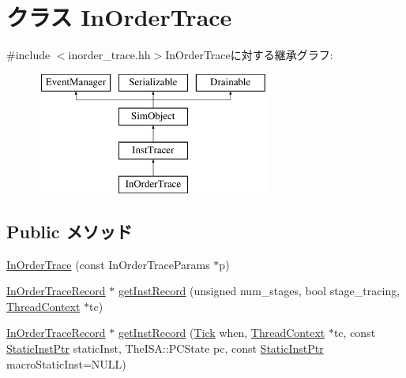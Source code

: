 \hypertarget{classTrace_1_1InOrderTrace}{
\section{クラス InOrderTrace}
\label{classTrace_1_1InOrderTrace}
}


{\ttfamily \#include $<$inorder\_\-trace.hh$>$}InOrderTraceに対する継承グラフ:\begin{figure}[H]
\begin{center}
\leavevmode
\includegraphics[height=4cm]{classTrace_1_1InOrderTrace}
\end{center}
\end{figure}
\subsection*{Public メソッド}
\begin{DoxyCompactItemize}
\item 
\hyperlink{classTrace_1_1InOrderTrace_ac03cbb45d572f3af9fe57cf76d843692}{InOrderTrace} (const InOrderTraceParams $\ast$p)
\item 
\hyperlink{classTrace_1_1InOrderTraceRecord}{InOrderTraceRecord} $\ast$ \hyperlink{classTrace_1_1InOrderTrace_a2782dbbbe99c4155b3fd1702975fd443}{getInstRecord} (unsigned num\_\-stages, bool stage\_\-tracing, \hyperlink{classThreadContext}{ThreadContext} $\ast$tc)
\item 
\hyperlink{classTrace_1_1InOrderTraceRecord}{InOrderTraceRecord} $\ast$ \hyperlink{classTrace_1_1InOrderTrace_ae6b2b97097c71fb61fee749eace9166e}{getInstRecord} (\hyperlink{base_2types_8hh_a5c8ed81b7d238c9083e1037ba6d61643}{Tick} when, \hyperlink{classThreadContext}{ThreadContext} $\ast$tc, const \hyperlink{classRefCountingPtr}{StaticInstPtr} staticInst, TheISA::PCState pc, const \hyperlink{classRefCountingPtr}{StaticInstPtr} macroStaticInst=NULL)
\end{DoxyCompactItemize}


